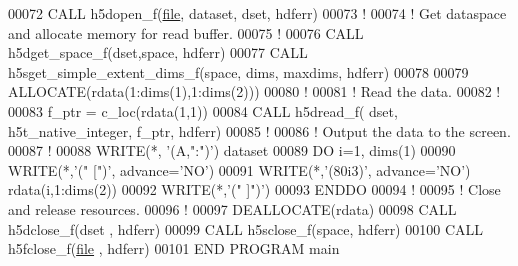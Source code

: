 \begin{DoxyCode}
00072   \textcolor{keyword}{CALL }h5dopen\_f(\hyperlink{structfile}{file}, dataset, dset, hdferr)
00073   \textcolor{comment}{!}
00074   \textcolor{comment}{! Get dataspace and allocate memory for read buffer.}
00075   \textcolor{comment}{!}
00076   \textcolor{keyword}{CALL }h5dget\_space\_f(dset,space, hdferr)
00077   \textcolor{keyword}{CALL }h5sget\_simple\_extent\_dims\_f(space, dims, maxdims, hdferr)
00078 
00079   \textcolor{keyword}{ALLOCATE}(rdata(1:dims(1),1:dims(2)))
00080   \textcolor{comment}{!}
00081   \textcolor{comment}{! Read the data.}
00082   \textcolor{comment}{!}
00083   f\_ptr = c\_loc(rdata(1,1))
00084   \textcolor{keyword}{CALL }h5dread\_f( dset, h5t\_native\_integer, f\_ptr, hdferr)
00085   \textcolor{comment}{!}
00086   \textcolor{comment}{! Output the data to the screen.}
00087   \textcolor{comment}{!}
00088   \textcolor{keyword}{WRITE}(*, \textcolor{stringliteral}{'(A,":")'}) dataset
00089   \textcolor{keywordflow}{DO} i=1, dims(1)
00090      \textcolor{keyword}{WRITE}(*,\textcolor{stringliteral}{'(" [")'}, advance=\textcolor{stringliteral}{'NO'})
00091      \textcolor{keyword}{WRITE}(*,\textcolor{stringliteral}{'(80i3)'}, advance=\textcolor{stringliteral}{'NO'}) rdata(i,1:dims(2))
00092      \textcolor{keyword}{WRITE}(*,\textcolor{stringliteral}{'(" ]")'})
00093 \textcolor{keywordflow}{  ENDDO}
00094   \textcolor{comment}{!}
00095   \textcolor{comment}{! Close and release resources.}
00096   \textcolor{comment}{!}
00097   \textcolor{keyword}{DEALLOCATE}(rdata)
00098   \textcolor{keyword}{CALL }h5dclose\_f(dset , hdferr)
00099   \textcolor{keyword}{CALL }h5sclose\_f(space, hdferr)
00100   \textcolor{keyword}{CALL }h5fclose\_f(\hyperlink{structfile}{file} , hdferr)
00101 \textcolor{keyword}{END PROGRAM }main
\end{DoxyCode}
